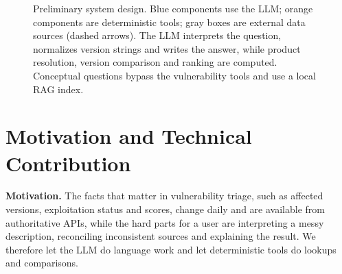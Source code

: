 \documentclass[final]{cvpr}
\begin{document}
\begin{figure}[t]
\caption{Preliminary system design. Blue components use the LLM; orange components are deterministic tools; gray boxes are external data sources (dashed arrows). The LLM interprets the question, normalizes version strings and writes the answer, while product resolution, version comparison and ranking are computed. Conceptual questions bypass the vulnerability tools and use a local RAG index.}
\label{fig_system}
\end{figure}

\section{Motivation and Technical Contribution}
\label{sec:motivation}

\textbf{Motivation.} The facts that matter in vulnerability triage, such as affected versions, exploitation status and scores, change daily and are available from authoritative APIs, while the hard parts for a user are interpreting a messy description, reconciling inconsistent sources and explaining the result. We therefore let the LLM do language work and let deterministic tools do lookups and comparisons.
\end{document}
